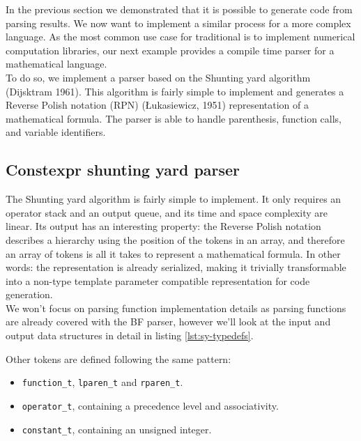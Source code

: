 \documentclass[../../main.tex]{subfiles}
\begin{document}
In the previous section we demonstrated that it is possible to generate code
from \constexpr parsing results. We now want to implement a similar process for
a more complex language. As the most common use case for traditional
\cpp \dsel is to implement numerical computation libraries, our next example
provides a compile time parser for a mathematical language.\\

To do so, we implement a \constexpr parser based on the Shunting
yard algorithm (Dijsktram 1961). This algorithm is fairly simple to implement
and generates a Reverse Polish notation (RPN) (Łukasiewicz, 1951) representation
of a mathematical formula. The parser is able to handle parenthesis, function calls,
and variable identifiers.

\subsection{Constexpr shunting yard parser}

The Shunting yard algorithm is fairly simple to implement. It only requires an
operator stack and an output queue, and its time and space complexity are
linear. Its output has an interesting property: the Reverse Polish notation
describes a hierarchy using the position of the tokens in an array, and
therefore an array of tokens is all it takes to represent a mathematical formula.
In other words: the representation is already serialized, making it trivially
transformable into a non-type template parameter compatible representation for
code generation.\\

We won't focus on parsing function implementation details as
\constexpr parsing functions are already covered with the BF parser, however
we'll look at the input and output data structures in detail in
listing \ref{lst:sy-typedefs}.



Other tokens are defined following the same pattern:

\begin{itemize}
\item \lstinline|function_t|, \lstinline|lparen_t| and \lstinline|rparen_t|.
\item \lstinline|operator_t|, containing a precedence level and associativity.
\item \lstinline|constant_t|, containing an unsigned integer.
\end{itemize}
\end{document}

